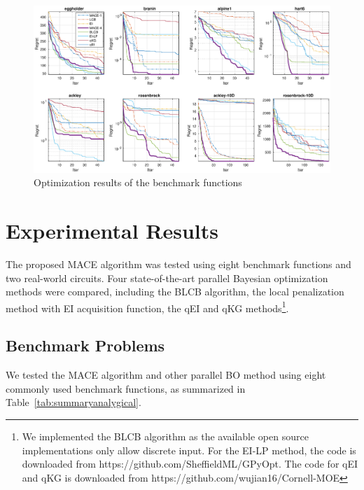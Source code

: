 
\begin{figure}[htbp]
    \begin{center}
        \centerline{\includegraphics[width=1.0\linewidth]{./img/convplot.eps}}
        \caption{Optimization results of the benchmark functions}
        \label{fig:CovPlotBenchmark}
    \end{center}
\end{figure}

\section{Experimental Results}

The proposed MACE algorithm was tested using eight benchmark functions and two
real-world circuits. Four state-of-the-art parallel Bayesian optimization
methods were compared, including the BLCB algorithm, the local penalization
method with EI acquisition function, the qEI and qKG methods\footnote{We
implemented the BLCB algorithm as the available open source implementations only
allow discrete input. For the EI-LP method, the code is downloaded from
https://github.com/SheffieldML/GPyOpt. The code for qEI and qKG is
downloaded from https://github.com/wujian16/Cornell-MOE}.

\subsection{Benchmark Problems}

We tested the MACE algorithm and other parallel BO method using eight commonly used benchmark
functions, as summarized in Table~\ref{tab:summaryanalygical}.


